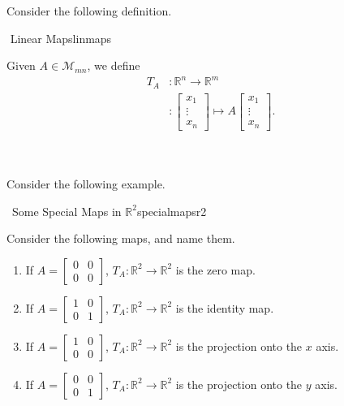         Consider the following definition.
        \begin{definition}{\Stop\,\,Linear Maps}{linmaps}
        
            Given \(A\in\mathcal{M}_{mn}\), we define
            \begin{align*}
                T_A&:\mathbb{R}^n\to\mathbb{R}^m \\
                &:\begin{bmatrix} x_1 \\ \vdots \\ x_n \end{bmatrix}\mapsto A\begin{bmatrix} x_1 \\ \vdots \\ x_n \end{bmatrix}.
            \end{align*}
            
        \end{definition}
        \vphantom
        \\
        \\
        Consider the following example.
        \begin{example}{\Difficulty\,\Difficulty\,\,Some Special Maps in \(\mathbb{R}^2\)}{specialmapsr2}
            
            Consider the following maps, and name them.
            \begin{enumerate}
                \item If \(A=\begin{bmatrix} 0 & 0 \\ 0 & 0 \end{bmatrix}\), \(T_A:\mathbb{R}^2\to\mathbb{R}^2\) is the zero map.
                \item If \(A=\begin{bmatrix} 1 & 0 \\ 0 & 1 \end{bmatrix}\), \(T_A:\mathbb{R}^2\to\mathbb{R}^2\) is the identity map.
                \item If \(A=\begin{bmatrix} 1 & 0 \\ 0 & 0 \end{bmatrix}\), \(T_A:\mathbb{R}^2\to\mathbb{R}^2\) is the projection onto the \(x\) axis.
                \item If \(A=\begin{bmatrix} 0 & 0 \\ 0 & 1 \end{bmatrix}\), \(T_A:\mathbb{R}^2\to\mathbb{R}^2\) is the projection onto the \(y\) axis.
            \end{enumerate}
            
        \end{example}

